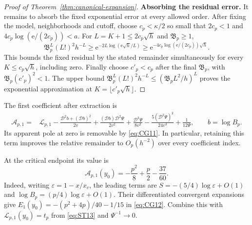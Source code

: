 \begin{proof}[Proof of Theorem~\ref{thm:canonical-expansion}]
\textbf{Absorbing the residual error.} It remains to absorb the fixed exponential error at every allowed
order. After fixing the model, neighborhoods and cutoff, choose
$c_p<\kappa/2$ so small that $2c_p<1$ and
$4c_p\log(\mathrm{e}/(2c_p))<a$. For $L=K+1\le2c_p\sqrt h$ and $\mathfrak B_p\ge1$,
\[
 \mathfrak B_p^L(L!)^2h^{-L}
 \ge \mathrm{e}^{-2L\log(\mathrm{e}\sqrt h/L)}
 \ge \mathrm{e}^{-4c_p\log(\mathrm{e}/(2c_p))\sqrt h}.
\]
This bounds the fixed residual by the stated remainder simultaneously
for every $K\le c_p\sqrt h$, including zero.
Finally choose $c'_p<c_p$ after the final $\mathfrak B_p$, with
$\mathfrak B_p(c'_p)^2<1$. The upper bound
$\mathfrak B_p^L(L!)^2h^{-L}\le(\mathfrak B_pL^2/h)^L$ proves the exponential
approximation at $K=\lfloor c'_p\sqrt h\rfloor$.
\end{proof}

The first coefficient after extraction is
\begin{equation}
 \begin{split}
 \mathcal A_{p,1}={}&\mathcal L_{p,1}
 -\frac{\mathscr D^2b+(\mathscr Db)^2}{2v}
 +\frac{(\mathscr Db)\mathscr D^2\Psi}{2v^2}
 +\frac{\mathscr D^3\Psi}{8v^2}
 -\frac{5(\mathscr D^2\Psi)^2}{24v^3}+\frac1{12\Psi},
 \qquad b=\log B_p.
 \end{split}
 \label{eq:CG12}
\end{equation}
Its apparent pole at zero is removable by \eqref{eq:CG11}.
In particular, retaining this term improves the relative remainder
to $O_p(h^{-2})$ over every coefficient index.

At the critical endpoint its value is
\begin{equation}
 \mathcal A_{p,1}(y_0)=-\frac{p^2}{8}+\frac p2-\frac{37}{60}.
 \label{eq:CG13}
\end{equation}
Indeed, writing $\varepsilon=1-x/x_c$, the leading terms are
$S=-(5/4)\log\varepsilon+O(1)$ and
$\log B_p=(p/4)\log\varepsilon+O(1)$.
Their differentiated convergent expansions give
$E_1(y_0)=-(p^2+4p)/40-1/15$ in \eqref{eq:CG12}.
Combine this with $\mathcal L_{p,1}(y_0)=t_p$ from
\eqref{eq:ST13} and $\Psi^{-1}\to0$.

